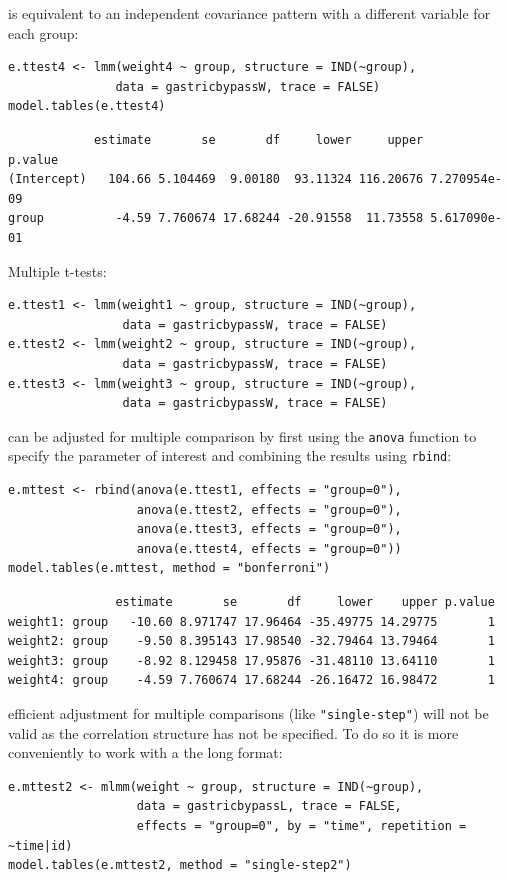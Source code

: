 \documentclass[12pt]{article}
\newcommand\Warning[1][3ex]{%
\renewcommand\stacktype{L}%
\scaleto{\stackon[1.3pt]{\color{red}$\triangle$}{\tiny\bfseries !}}{#1}%
\xspace
}
\begin{document}
is equivalent to an independent covariance pattern with a different
variable for each group:
\lstset{language=r,label= ,caption= ,captionpos=b,numbers=none}
\begin{lstlisting}
e.ttest4 <- lmm(weight4 ~ group, structure = IND(~group), 
               data = gastricbypassW, trace = FALSE)
model.tables(e.ttest4)
\end{lstlisting}

\begin{verbatim}
            estimate       se       df     lower     upper      p.value
(Intercept)   104.66 5.104469  9.00180  93.11324 116.20676 7.270954e-09
group          -4.59 7.760674 17.68244 -20.91558  11.73558 5.617090e-01
\end{verbatim}


Multiple t-tests:
\lstset{language=r,label= ,caption= ,captionpos=b,numbers=none}
\begin{lstlisting}
e.ttest1 <- lmm(weight1 ~ group, structure = IND(~group), 
                data = gastricbypassW, trace = FALSE)
e.ttest2 <- lmm(weight2 ~ group, structure = IND(~group), 
                data = gastricbypassW, trace = FALSE)
e.ttest3 <- lmm(weight3 ~ group, structure = IND(~group), 
                data = gastricbypassW, trace = FALSE)
\end{lstlisting}

can be adjusted for multiple comparison by first using the \texttt{anova}
function to specify the parameter of interest and combining the
results using \texttt{rbind}:
\lstset{language=r,label= ,caption= ,captionpos=b,numbers=none}
\begin{lstlisting}
e.mttest <- rbind(anova(e.ttest1, effects = "group=0"),
                  anova(e.ttest2, effects = "group=0"),
                  anova(e.ttest3, effects = "group=0"),
                  anova(e.ttest4, effects = "group=0"))
model.tables(e.mttest, method = "bonferroni")
\end{lstlisting}

\begin{verbatim}
               estimate       se       df     lower    upper p.value
weight1: group   -10.60 8.971747 17.96464 -35.49775 14.29775       1
weight2: group    -9.50 8.395143 17.98540 -32.79464 13.79464       1
weight3: group    -8.92 8.129458 17.95876 -31.48110 13.64110       1
weight4: group    -4.59 7.760674 17.68244 -26.16472 16.98472       1
\end{verbatim}


\Warning efficient adjustment for multiple comparisons (like
\texttt{"single-step"}) will not be valid as the correlation structure has
not be specified. To do so it is more conveniently to work with a the
long format:
\lstset{language=r,label= ,caption= ,captionpos=b,numbers=none}
\begin{lstlisting}
e.mttest2 <- mlmm(weight ~ group, structure = IND(~group),
                  data = gastricbypassL, trace = FALSE,
                  effects = "group=0", by = "time", repetition = ~time|id)
model.tables(e.mttest2, method = "single-step2")
\end{lstlisting}
\end{document}
